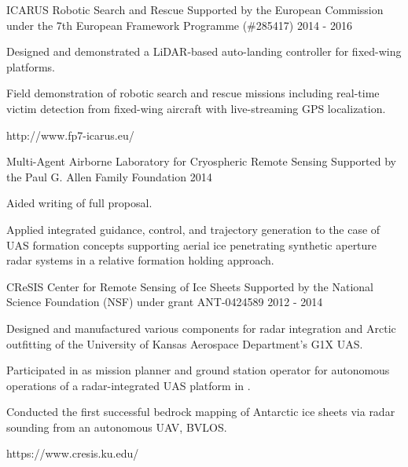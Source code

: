 \begin{cventries}
\cvprojwideentry
  	{ICARUS} %
  	{Robotic Search and Rescue} %
    {Supported by the European Commission under the 7th European Framework Programme (\#285417)} %
    {2014 - 2016} %
    {
      \begin{cvitems} %
        \item {Designed and demonstrated a LiDAR-based auto-landing controller for fixed-wing platforms.}
        \item {Field demonstration of robotic search and rescue missions including real-time victim detection from fixed-wing aircraft with live-streaming GPS localization.}
      \end{cvitems}
    } %
    {http://www.fp7-icarus.eu/} %
    {\showprojectdescriptions}

\cvprojwideentry
  	{Multi-Agent Airborne Laboratory for Cryospheric Remote Sensing} %
  	{} %
    {Supported by the Paul G. Allen Family Foundation} %
    {2014} %
    {
      \begin{cvitems} %
        \item {Aided writing of full proposal.}
        \item {Applied integrated guidance, control, and trajectory generation to the case of UAS formation concepts supporting aerial ice penetrating synthetic aperture radar systems in a relative formation holding approach.}
      \end{cvitems}
    } %
    {} %
    {\showprojectdescriptions}
    
\cvprojwideentry
  	{CReSIS} %
  	{Center for Remote Sensing of Ice Sheets} %
    {Supported by the National Science Foundation (NSF) under grant ANT-0424589} %
    {2012 - 2014} %
    {
      \begin{cvitems} %
        \item {Designed and manufactured various components for radar integration and Arctic outfitting of the University of Kansas Aerospace Department's G1X UAS.}
        \item {Participated in  as mission planner and ground station operator for autonomous operations of a radar-integrated UAS platform in .}
        \item {Conducted the first successful bedrock mapping of Antarctic ice sheets via radar sounding from an autonomous UAV, BVLOS.}
      \end{cvitems}
    } %
    {https://www.cresis.ku.edu/} %
    {\showprojectdescriptions}
    
\end{cventries}

